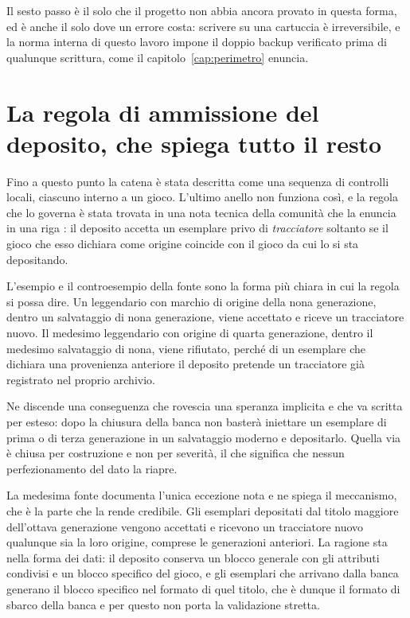 Il sesto passo è il solo che il progetto non abbia ancora provato in questa forma, ed è anche il solo dove un errore costa: scrivere su una cartuccia è irreversibile, e la norma interna di questo lavoro impone il doppio backup verificato prima di qualunque scrittura, come il capitolo~\ref{cap:perimetro} enuncia.

\section{La regola di ammissione del deposito, che spiega tutto il resto}

Fino a questo punto la catena è stata descritta come una sequenza di controlli locali, ciascuno interno a un gioco. L'ultimo anello non funziona così, e la regola che lo governa è stata trovata in una nota tecnica della comunità che la enuncia in una riga \cite{home-tracker-psa}: il deposito accetta un esemplare privo di \emph{tracciatore} soltanto se il gioco che esso dichiara come origine coincide con il gioco da cui lo si sta depositando.

L'esempio e il controesempio della fonte sono la forma più chiara in cui la regola si possa dire. Un leggendario con marchio di origine della nona generazione, dentro un salvataggio di nona generazione, viene accettato e riceve un tracciatore nuovo. Il medesimo leggendario con origine di quarta generazione, dentro il medesimo salvataggio di nona, viene rifiutato, perché di un esemplare che dichiara una provenienza anteriore il deposito pretende un tracciatore già registrato nel proprio archivio.

Ne discende una conseguenza che rovescia una speranza implicita e che va scritta per esteso: dopo la chiusura della banca non basterà iniettare un esemplare di prima o di terza generazione in un salvataggio moderno e depositarlo. Quella via è chiusa per costruzione e non per severità, il che significa che nessun perfezionamento del dato la riapre.

La medesima fonte documenta l'unica eccezione nota e ne spiega il meccanismo, che è la parte che la rende credibile. Gli esemplari depositati dal titolo maggiore dell'ottava generazione vengono accettati e ricevono un tracciatore nuovo qualunque sia la loro origine, comprese le generazioni anteriori. La ragione sta nella forma dei dati: il deposito conserva un blocco generale con gli attributi condivisi e un blocco specifico del gioco, e gli esemplari che arrivano dalla banca generano il blocco specifico nel formato di quel titolo, che è dunque il formato di sbarco della banca e per questo non porta la validazione stretta.

